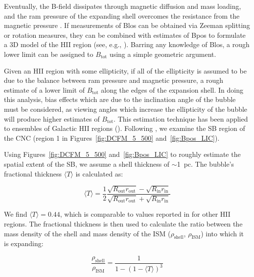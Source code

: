 Eventually, the B-field dissipates through magnetic diffusion and mass loading, and the ram pressure of the expanding shell overcomes the resistance from the magnetic pressure \citep{pavel2012h}. If measurements of \gls{Blos} can be obtained via Zeeman splitting or rotation measures, they can be combined with estimates of \gls{Bpos} to formulate a 3D model of the HII region (see, e.g., \citet{aghanim2016planck}). Barring any knowledge of \gls{Blos}, a rough lower limit can be assigned to $B_{\mathrm{\mathrm{tot}}}$ using a simple geometric argument.

Given an HII region with some ellipticity, if all of the ellipticity is assumed to be due to the balance between ram pressure and magnetic pressure, a rough estimate of a lower limit of $B_{\mathrm{\mathrm{tot}}}$ along the edges of the expansion shell. In doing this analysis, bias effects which are due to the inclination angle of the bubble must be considered, as viewing angles which increase the ellipticity of the bubble will produce higher estimates of $B_{\mathrm{\mathrm{tot}}}$. This estimation technique has been applied to ensembles of Galactic HII regions (\citet{churchwell2006bubbling,pavel2012h}). Following \citet{pavel2012h}, we examine the SB region of the CNC (region 1 in Figures~\ref{fig:DCFM_5_500} and~\ref{fig:Bpos_LIC}).

Using Figures~\ref{fig:DCFM_5_500} and~\ref{fig:Bpos_LIC} to roughly estimate the spatial extent of the SB, we assume a shell thickness of $\sim$1~pc. The bubble's fractional thickness $\langle T \rangle$ is calculated as:

\begin{equation}
  \langle T \rangle = \frac{1}{2} \frac{ \sqrt{R_{\mathrm{out}}r_{\mathrm{out}}} - \sqrt{R_{\mathrm{in}}r_{\mathrm{in}}} }{\sqrt{R_{\mathrm{out}}r_{\mathrm{out}}} + \sqrt{R_{\mathrm{in}}r_{\mathrm{in}}}}
\end{equation}

We find $\langle T \rangle = 0.44$, which is comparable to values reported in \citet{pavel2012h} for other HII regions. The fractional thickness is then used to calculate the ratio between the mass density of the shell and mass density of the ISM ($\rho_{\mathrm{shell}}$, $\rho_{\mathrm{ISM}}$) into which it is expanding:

\begin{equation}\label{eq:rho rat}
  \frac{\rho_{\mathrm{shell}}}{\rho_{\mathrm{ISM}}} = \frac{ 1 }{1 - \left( 1 - \langle T \rangle \right)^{3}}
\end{equation}

